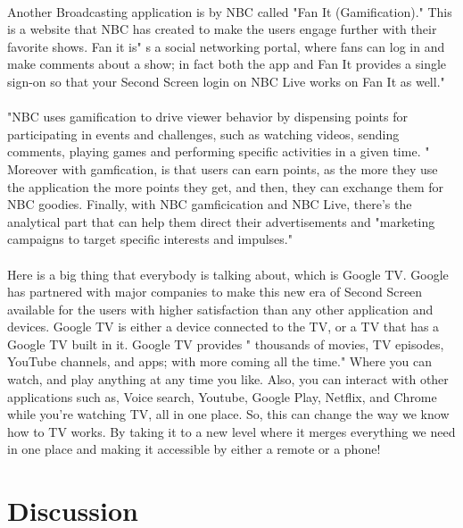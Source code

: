 \documentclass[12pt, oneside]{article}   	%
\begin{document}
 \paragraph{}
Another Broadcasting application is by NBC called "Fan It (Gamification)." This is a website that NBC has created to make the users engage further with their favorite shows.  Fan it is" s a social networking portal, where fans can log in and make comments about a show; in fact both the app and Fan It provides a single sign-on so that your Second Screen login on NBC Live works on Fan It as well." \cite{Second-Screen-Art}
  \paragraph{}
"NBC uses gamification to drive viewer behavior by dispensing points for participating in events and 
challenges, such as watching videos, sending comments, playing games and performing specific 
activities in a given time. "\cite{Second-Screen-Art}  Moreover with gamfication, is that users can earn points, as the more they use the application the more points they get, and then, they can exchange them for NBC goodies.  Finally, with NBC gamficication and NBC Live, there's the analytical part that can help them direct their advertisements and "marketing campaigns to target specific interests and 
impulses."\cite{Second-Screen-Art}
  \paragraph{}
Here is a big thing that everybody is talking about, which is Google TV.  Google has partnered with major companies to make this new era of Second Screen available for the users with higher satisfaction than any other application and devices.  Google TV is either a device connected to the TV, or a TV that has a Google TV built in it.  Google TV provides " thousands of movies, TV episodes, YouTube channels, and apps; with more coming all the time."\cite{Google} Where you can watch, and play anything at any time you like. Also, you can interact with other applications such as, Voice search, Youtube, Google Play, Netflix, and Chrome while you're watching TV, all in one place.  So, this can change the way we know how to TV works. By taking it to a new level where it merges everything we need in one place and making it accessible by either a remote or a phone!
  \section{Discussion}
\end{document}
